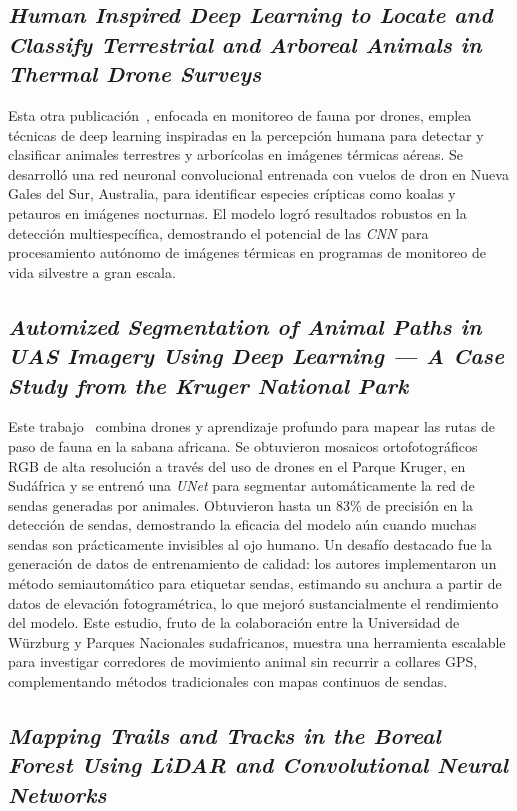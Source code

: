\subsection { \textit{ Human Inspired Deep Learning to Locate and Classify Terrestrial and Arboreal Animals in Thermal Drone Surveys}}

Esta otra publicación~\cite{Backman2025}, enfocada en monitoreo de fauna por drones, emplea técnicas de deep learning inspiradas en la percepción humana para detectar y clasificar animales terrestres y arborícolas en imágenes térmicas aéreas. Se desarrolló una red neuronal convolucional entrenada con vuelos de dron en Nueva Gales del Sur, Australia, para identificar especies crípticas como koalas y petauros en imágenes nocturnas. El modelo logró resultados robustos en la detección multiespecífica, demostrando el potencial de las \textit{CNN} para procesamiento autónomo de imágenes térmicas en programas de monitoreo de vida silvestre a gran escala.

\subsection { \textit{ Automized Segmentation of Animal Paths in UAS Imagery Using Deep Learning — A Case Study from the Kruger National Park}}

Este trabajo~\cite{Muller2025} combina drones y aprendizaje profundo para mapear las rutas de paso de fauna en la sabana africana. Se obtuvieron mosaicos ortofotográficos RGB de alta resolución a través del uso de drones en el Parque Kruger, en Sudáfrica y se entrenó una \textit{UNet} para segmentar automáticamente la red de sendas generadas por animales. Obtuvieron hasta un 83\% de precisión en la detección de sendas, demostrando la eficacia del modelo aún cuando muchas sendas son prácticamente invisibles al ojo humano. Un desafío destacado fue la generación de datos de entrenamiento de calidad: los autores implementaron un método semiautomático para etiquetar sendas, estimando su anchura a partir de datos de elevación fotogramétrica, lo que mejoró sustancialmente el rendimiento del modelo. Este estudio, fruto de la colaboración entre la Universidad de Würzburg y Parques Nacionales sudafricanos, muestra una herramienta escalable para investigar corredores de movimiento animal sin recurrir a collares GPS, complementando métodos tradicionales con mapas continuos de sendas.

\subsection { \textit{ Mapping Trails and Tracks in the Boreal Forest Using LiDAR and Convolutional Neural Networks}}

